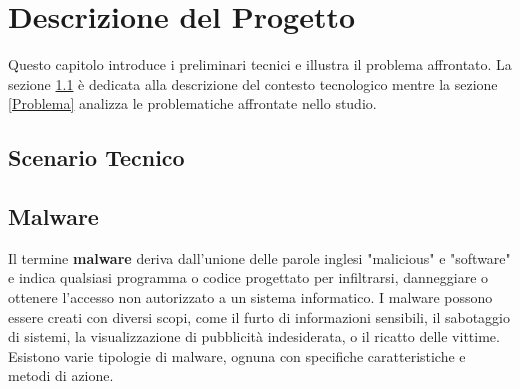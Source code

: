 \chapter{Descrizione del Progetto}
\label{cap:descrizione}

Questo capitolo introduce i preliminari tecnici e illustra il problema affrontato. La sezione \ref{Scenario} è dedicata alla descrizione del contesto tecnologico mentre la sezione \ref{Problema} analizza le problematiche affrontate nello studio. 

\section{Scenario Tecnico}
\label{Scenario}

\section{Malware}
Il termine \textbf{malware} deriva dall'unione delle parole inglesi "malicious" e "software" e indica qualsiasi programma o codice progettato per infiltrarsi, danneggiare o ottenere l'accesso non autorizzato a un sistema informatico. I malware possono essere creati con diversi scopi, come il furto di informazioni sensibili, il sabotaggio di sistemi, la visualizzazione di pubblicità indesiderata, o il ricatto delle vittime. Esistono varie tipologie di malware, ognuna con specifiche caratteristiche e metodi di azione.


